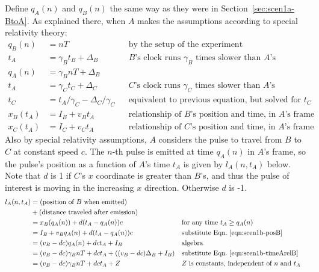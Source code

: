 \documentclass[a4paper]{article}
\theoremstyle{plain}
\theoremstyle{definition}
\begin{document}
Define $q_A(n)$ and $q_B(n)$ the same way as they were in
Section~\ref{sec:scen1a-BtoA}.  As explained there, when $A$ makes the
assumptions according to special relativity theory:
\begin{align}
q_B(n) & = nT & & \text{by the setup of the experiment} \nonumber \\
t_A & = \gamma_B t_B + \Delta_B & & \text{$B$'s clock runs $\gamma_B$ times slower than $A$'s} \nonumber \\
q_A(n) & = \gamma_B nT + \Delta_B \label{eqn:scen1b-timeArelB} \\
t_A & = \gamma_C t_C + \Delta_C & & \text{$C$'s clock runs $\gamma_C$ times slower than $A$'s} \nonumber \\
t_C & = t_A/\gamma_C - \Delta_C/\gamma_C & & \text{equivalent to previous equation, but solved for $t_C$} \label{eqn:scen1b-timeArelC} \\
x_B(t_A) & = I_B + v_B t_A & & \text{relationship of $B$'s position and time, in $A$'s frame} \label{eqn:scen1b-posB} \\
x_C(t_A) & = I_C + v_C t_A & & \text{relationship of $C$'s position and time, in $A$'s frame} \label{eqn:scen1b-posC}
\end{align}
Also by special relativity assumptions, $A$ considers the pulse to
travel from $B$ to $C$ at constant speed $c$.
The $n$-th pulse is emitted at time $q_A(n)$ in $A$'s frame, so the
pulse's position as a function of $A$'s time $t_A$ is given by
$l_A(n, t_A)$ below.
Note that $d$ is 1 if $C$'s $x$ coordinate is greater than $B$'s, and
thus the pulse of interest is moving in the increasing $x$
direction.  Otherwise $d$ is -1.
\begin{align*}
l_A(n, t_A)
  & = \text{(position of $B$ when emitted)} \\
  &   + \text{(distance traveled after emission)} \\
  & = x_B(q_A(n)) + d (t_A - q_A(n)) c & & \text{for any time $t_A \geq q_A(n)$} \\
  & = I_B + v_B q_A(n) + d (t_A - q_A(n)) c & & \text{substitute Eqn.~\eqref{eqn:scen1b-posB}} \\
  & = (v_B - dc) q_A(n) + dc t_A + I_B & & \text{algebra} \\
  & = (v_B - dc) \gamma_B nT + dc t_A + ((v_B-dc)\Delta_B + I_B) & & \text{substitute Eqn.~\eqref{eqn:scen1b-timeArelB}} \\
  & = (v_B - dc) \gamma_B nT + dc t_A + Z & & \text{$Z$ is constants, independent of $n$ and $t_A$}
\end{align*}
\end{document}
